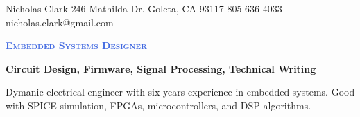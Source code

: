 \documentclass[letterpaper, 10pt]{article}
\begin{document}
\nrctitle
{Nicholas Clark}
{246 Mathilda Dr.}
{Goleta, CA 93117}
{805-636-4033}
{nicholas.clark@gmail.com}
%
\begin{center}\par\smallskip
\textcolor{RoyalBlue}{\Large \textbf{\textsc{Embedded Systems Designer}}}\par
\large \textbf{{Circuit Design, Firmware, Signal Processing, Technical Writing}}\par
\smallskip
\noindent \begin{minipage}[t]{0.75\textwidth}%
\begin{sloppypar}
Dymanic electrical engineer with six years experience in embedded systems. 
Good with SPICE simulation, FPGAs, microcontrollers, and DSP algorithms.
\end{sloppypar}
\end{minipage}
\end{center}
\par \smallskip \smallskip
%
%
\end{document}
